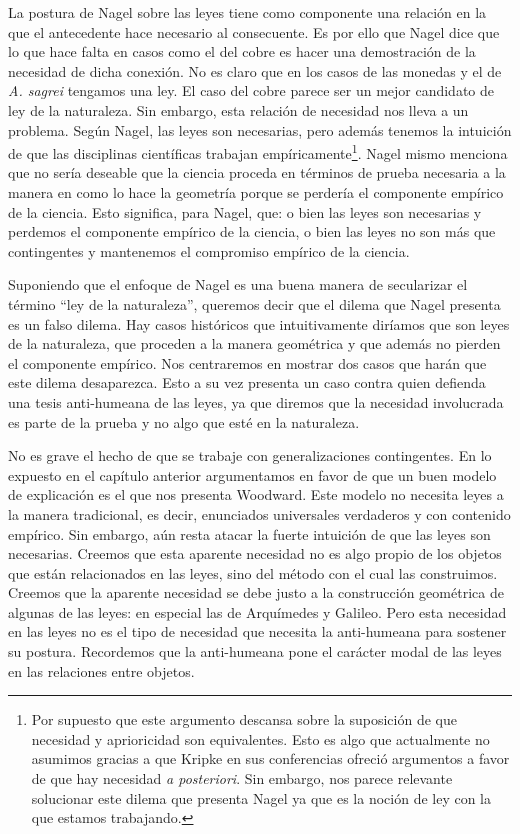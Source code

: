 La postura de Nagel sobre las leyes tiene como componente una relación en la que el antecedente hace necesario al consecuente. Es por ello que Nagel dice que lo que hace falta en casos como el del cobre es hacer una demostración de la necesidad de dicha conexión. No es claro que en los casos de las monedas y el de \emph{A. sagrei} tengamos una ley. El caso del cobre parece ser un mejor candidato de ley de la naturaleza. Sin embargo, esta relación de necesidad nos lleva a un problema. Según Nagel, las leyes son necesarias, pero además tenemos la intuición de que las disciplinas científicas trabajan empíricamente\footnote{Por supuesto que este argumento descansa sobre la suposición de que necesidad y aprioricidad son equivalentes. Esto es algo que actualmente no asumimos gracias a que Kripke en sus conferencias ofreció argumentos a favor de que hay necesidad \textit{a posteriori}. Sin embargo, nos parece relevante solucionar este dilema que presenta Nagel ya que es la noción de ley con la que estamos trabajando.}. Nagel mismo menciona que no sería deseable que la ciencia proceda en términos de prueba necesaria a la manera en como lo hace la geometría \cite[cfr., p. 53]{Nagel2006} porque se perdería el componente empírico de la ciencia. Esto significa, para Nagel, que: o bien las leyes son necesarias y perdemos el componente empírico de la ciencia, o bien las leyes no son más que contingentes y mantenemos el compromiso empírico de la ciencia.

Suponiendo que el enfoque de Nagel es una buena manera de secularizar el término ``ley de la naturaleza'', queremos decir que el dilema que Nagel presenta es un falso dilema. Hay casos históricos que intuitivamente diríamos que son leyes de la naturaleza, que proceden a la manera geométrica y que además no pierden el componente empírico. Nos centraremos en mostrar dos casos que harán que este dilema desaparezca. Esto a su vez presenta un caso contra quien defienda una tesis anti-humeana de las leyes, ya que diremos que la necesidad involucrada es parte de la prueba y no algo que esté en la naturaleza.

No es grave el hecho de que se trabaje con generalizaciones contingentes. En lo expuesto en el capítulo anterior argumentamos en favor de que un buen modelo de explicación es el que nos presenta Woodward. Este modelo no necesita leyes a la manera tradicional, es decir, enunciados universales verdaderos y con contenido empírico. Sin embargo, aún resta atacar la fuerte intuición de que las leyes son necesarias. Creemos que esta aparente necesidad no es algo propio de los objetos que están relacionados en las leyes, sino del método con el cual las construimos. Creemos que la aparente necesidad se debe justo a la construcción geométrica de algunas de las leyes: en especial las de Arquímedes y Galileo. Pero esta necesidad en las leyes no es el tipo de necesidad que necesita la anti-humeana para sostener su postura. Recordemos que la anti-humeana pone el carácter modal de las leyes en las relaciones entre objetos.

